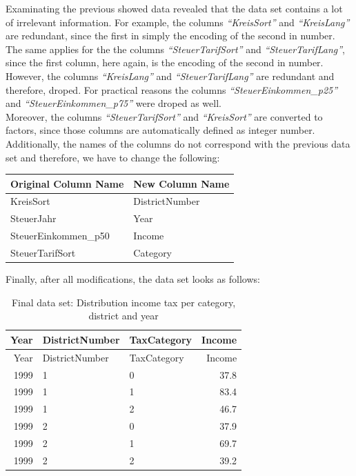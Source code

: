 \documentclass[
]{article}
\begin{document}
Examinating the previous showed data revealed that the data set contains
a lot of irrelevant information. For example, the columns
\emph{``KreisSort''} and \emph{``KreisLang''} are redundant, since the
first in simply the encoding of the second in number. The same applies
for the the columns \emph{``SteuerTarifSort''} and
\emph{``SteuerTarifLang''}, since the first column, here again, is the
encoding of the second in number. However, the columns
\emph{``KreisLang''} and \emph{``SteuerTarifLang''} are redundant and
therefore, droped. For practical reasons the columns
\emph{``SteuerEinkommen\_p25''} and \emph{``SteuerEinkommen\_p75''} were
droped as well.\\
Moreover, the columns \emph{``SteuerTarifSort''} and
\emph{``KreisSort''} are converted to factors, since those columns are
automatically defined as integer number. Additionally, the names of the
columns do not correspond with the previous data set and therefore, we
have to change the following:

\begin{longtable}[]{@{}ll@{}}
\toprule
Original Column Name & New Column Name \\
\midrule
\endhead
KreisSort & DistrictNumber \\
SteuerJahr & Year \\
SteuerEinkommen\_p50 & Income \\
SteuerTarifSort & Category \\
\bottomrule
\end{longtable}

Finally, after all modifications, the data set looks as follows:

\begin{longtable}[]{@{}rllr@{}}
\caption{Final data set: Distribution income tax per category, district
and year}\tabularnewline
\toprule
Year & DistrictNumber & TaxCategory & Income \\
\midrule
\endfirsthead
\toprule
Year & DistrictNumber & TaxCategory & Income \\
\midrule
\endhead
1999 & 1 & 0 & 37.8 \\
1999 & 1 & 1 & 83.4 \\
1999 & 1 & 2 & 46.7 \\
1999 & 2 & 0 & 37.9 \\
1999 & 2 & 1 & 69.7 \\
1999 & 2 & 2 & 39.2 \\
\bottomrule
\end{longtable}
\end{document}
